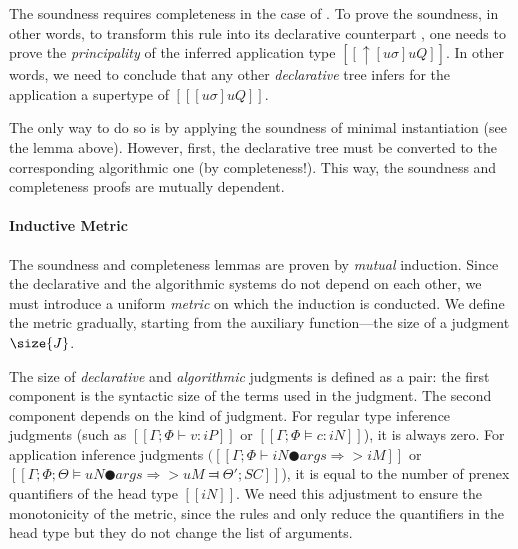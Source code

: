 The soundness requires completeness in the case of
. To prove the soundness, in other words, to
transform this rule into its declarative counterpart
, one needs to prove the \emph{principality} of
the inferred application type $[[↑[uσ]uQ]]$. In other words, we need to conclude
that any other \emph{declarative} tree infers for the application a supertype of
$[[ [uσ]uQ ]]$. 

The only way to do so is by applying the soundness of minimal instantiation
(see the lemma above). However, first, the declarative
tree must be converted to the corresponding algorithmic one (by completeness!).
This way, the soundness and completeness proofs are mutually dependent.

\paragraph*{Inductive Metric}
    The soundness and completeness lemmas are proven by \emph{mutual} induction. 
    Since the declarative and the algorithmic systems do not depend on each other,
    we must introduce a uniform \emph{metric} on which the induction is conducted.
    We define the metric gradually, starting from the
    auxiliary function---the size of a judgment $\size{J}$.

    The size of \emph{declarative} and \emph{algorithmic} judgments is defined as
    a pair: the first component is the syntactic size of the terms used in the judgment. 
    The second component depends on the kind of judgment. For regular
    type inference judgments (such as $[[Γ ; Φ ⊢ v : iP]]$
    or $[[Γ ; Φ ⊨ c : iN]]$), it is always zero. For application inference judgments
    $([[Γ ; Φ ⊢ iN ● args ⇒> iM]]$ or $[[Γ ; Φ ; Θ ⊨ uN ● args ⇒> uM ⫤ Θ'; SC]]$), 
    it is equal to the number of prenex quantifiers of the head type $[[iN]]$.
    We need this adjustment to ensure the monotonicity of the metric, since the rules 
     and 
    only reduce the quantifiers in the head type but they do not change the list of arguments.

